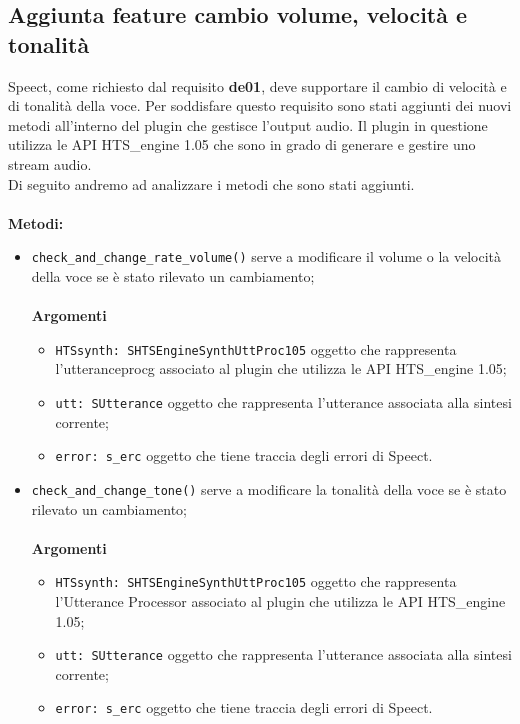 \subsection{Aggiunta feature cambio volume, velocità e tonalità}
Speect, come richiesto dal requisito \textbf{de01}, deve supportare il cambio di velocità e di tonalità della voce. 
Per soddisfare questo requisito sono stati aggiunti dei nuovi metodi all'interno del plugin che gestisce l'output audio.
Il plugin in questione utilizza le API HTS\_engine 1.05 che sono in grado di generare e gestire uno stream audio.\\
Di seguito andremo ad analizzare i metodi che sono stati aggiunti.\\\\
\textbf{Metodi:}
\begin{itemize}
	\item \texttt{check\_and\_change\_rate\_volume()} serve a modificare il volume o la velocità della voce se è stato rilevato un cambiamento;\\\\
	\textbf{Argomenti}
	\begin{itemize}
		\item \texttt{HTSsynth: SHTSEngineSynthUttProc105} oggetto che rappresenta l'\gls{utteranceprocg} associato al plugin che utilizza le API HTS\_engine 1.05;
		\item \texttt{utt: SUtterance} oggetto che rappresenta l'utterance associata alla sintesi corrente;
		\item \texttt{error: s\_erc} oggetto che tiene traccia degli errori di Speect.
	\end{itemize}
	\item \texttt{check\_and\_change\_tone()} serve a modificare la tonalità della voce se è stato rilevato un cambiamento;\\\\
	\textbf{Argomenti}
	\begin{itemize}
		\item \texttt{HTSsynth: SHTSEngineSynthUttProc105} oggetto che rappresenta l'Utterance Processor associato al plugin che utilizza le API HTS\_engine 1.05;
		\item \texttt{utt: SUtterance} oggetto che rappresenta l'utterance associata alla sintesi corrente;
		\item \texttt{error: s\_erc} oggetto che tiene traccia degli errori di Speect.
	\end{itemize}
\end{itemize}

